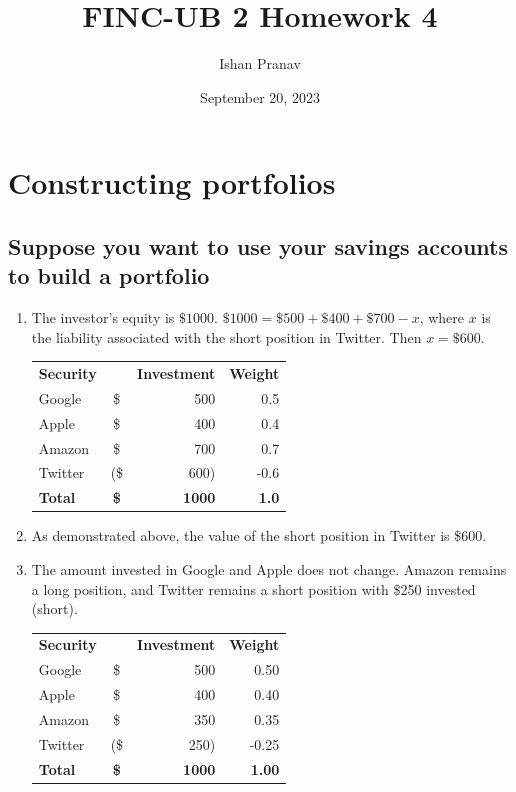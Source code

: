 \documentclass[12pt]{article}
\title{FINC-UB 2 Homework 4}
\author{Ishan Pranav}
\date{September 20, 2023}
\begin{document}
\maketitle
\section{Constructing portfolios}
\subsection{Suppose you want to use your savings accounts to build a portfolio}
\begin{enumerate}
\item The investor's equity is $\$1000$. $\$1000=\$500+\$400+\$700-x$, where $x$ is the liability associated with the short position in Twitter. Then $x=\$600$.
\begin{center}
\begin{tabular}{l|cr|r}
\textbf{Security}&&\textbf{Investment}&\textbf{Weight}\\
Google&\$&500&0.5\\
Apple&\$&400&0.4\\
Amazon&\$&700&0.7\\
Twitter&(\$&600)&-0.6\\
\textbf{Total}&\textbf{\$}&\textbf{1000}&\textbf{1.0}\\
\end{tabular}
\end{center}
\item As demonstrated above, the value of the short position in Twitter is \$600.
\item The amount invested in Google and Apple does not change. Amazon remains a long position, and Twitter remains a short position with \$250 invested (short).
\begin{center}
\begin{tabular}{l|cr|r}
\textbf{Security}&&\textbf{Investment}&\textbf{Weight}\\
Google&\$&500&0.50\\
Apple&\$&400&0.40\\
Amazon&\$&350&0.35\\
Twitter&(\$&250)&-0.25\\
\textbf{Total}&\textbf{\$}&\textbf{1000}&\textbf{1.00}\\
\end{tabular}
\end{center}
\end{enumerate}
\end{document}

